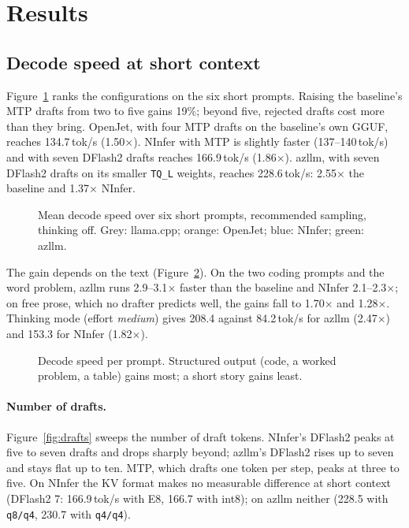 \section{Results}
\label{sec:results}

\subsection{Decode speed at short context}

Figure~\ref{fig:speed} ranks the configurations on the six short prompts. Raising the
baseline's MTP drafts from two to five gains 19\%; beyond five, rejected drafts cost more than
they bring. OpenJet, with four MTP drafts on the baseline's own GGUF, reaches 134.7\,tok/s
(1.50$\times$). NInfer with MTP is slightly faster (137--140\,tok/s) and with seven DFlash2
drafts reaches 166.9\,tok/s (1.86$\times$). azllm, with seven DFlash2 drafts on its smaller
\texttt{TQ\_L} weights, reaches 228.6\,tok/s: 2.55$\times$ the baseline and 1.37$\times$
NInfer.

\begin{figure}[t]
  \centering
  
  \caption{Mean decode speed over six short prompts, recommended sampling, thinking off.
           Grey: llama.cpp; orange: OpenJet; blue: NInfer; green: azllm.}
  \label{fig:speed}
\end{figure}

The gain depends on the text (Figure~\ref{fig:perprompt}). On the two coding prompts and the
word problem, azllm runs 2.9--3.1$\times$ faster than the baseline and NInfer 2.1--2.3$\times$;
on free prose, which no drafter predicts well, the gains fall to 1.70$\times$ and
1.28$\times$. Thinking mode (effort \emph{medium}) gives 208.4 against 84.2\,tok/s for azllm
(2.47$\times$) and 153.3 for NInfer (1.82$\times$).

\begin{figure}[t]
  \centering
  
  \caption{Decode speed per prompt. Structured output (code, a worked problem, a table) gains
           most; a short story gains least.}
  \label{fig:perprompt}
\end{figure}

\paragraph{Number of drafts.}
Figure~\ref{fig:drafts} sweeps the number of draft tokens. NInfer's DFlash2 peaks at five to
seven drafts and drops sharply beyond; azllm's DFlash2 rises up to seven and stays flat up to
ten. MTP, which drafts one token per step, peaks at three to five. On NInfer the KV format makes
no measurable difference at short context (DFlash2 7: 166.9\,tok/s with E8, 166.7 with int8);
on azllm neither (228.5 with \texttt{q8/q4}, 230.7 with \texttt{q4/q4}).

